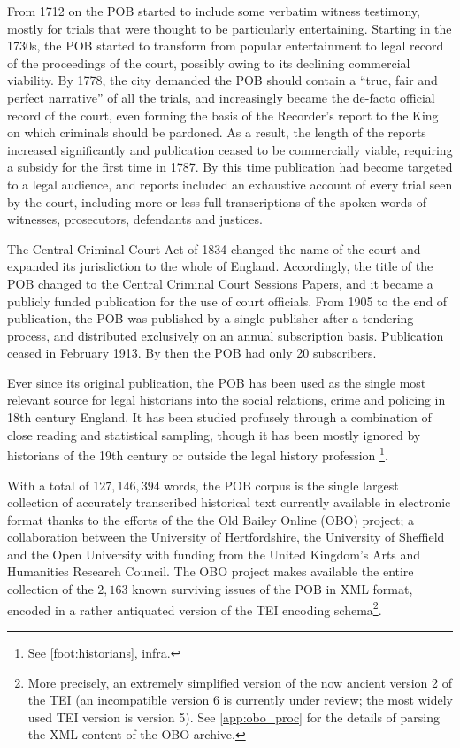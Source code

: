 From 1712 on the POB started to include some verbatim witness testimony, mostly for trials that were thought to be particularly entertaining.
Starting in the 1730s, the POB started to transform from popular entertainment to legal record of the proceedings of the court, possibly owing to its declining commercial viability.
By 1778, the city demanded the POB should contain a \enquote{true, fair and perfect narrative} of all the trials, and increasingly became the de-facto official record of the court, even forming the basis of the Recorder's report to the King on which criminals should be pardoned.
As a result, the length of the reports increased significantly and publication ceased to be commercially viable, requiring a subsidy for the first time in 1787.
By this time publication had become targeted to a legal audience, and reports included an exhaustive account of every trial seen by the court, including more or less full transcriptions of the spoken words of witnesses, prosecutors, defendants and justices.

The Central Criminal Court Act of 1834 changed the name of the court and expanded its jurisdiction to the whole of England.
Accordingly, the title of the POB changed to the Central Criminal Court Sessions Papers, and it became a publicly funded publication for the use of court officials.
From 1905 to the end of publication, the POB was published by a single publisher after a tendering process, and distributed exclusively on an annual subscription basis.
Publication ceased in February 1913.
By then the POB had only 20 subscribers.

Ever since its original publication, the POB has been used as the single most relevant source for legal historians into the social relations, crime and policing in 18th century England. It has been studied profusely through a combination of close reading and statistical sampling, though it has been mostly ignored by historians of the 19th century or outside the legal history profession \citep{hitchcock2016}\footnote{
    See \autoref{foot:historians}, infra.
}.

With a total of $127,146,394$ words, the POB corpus is the single largest collection of accurately transcribed historical text currently available in electronic format thanks to the efforts of the the Old Bailey Online (OBO) project; a collaboration between the University of Hertfordshire, the University of Sheffield and the Open University with funding from the United Kingdom's Arts and Humanities Research Council.
The OBO project makes available the entire collection of the $2,163$ known surviving issues of the POB in XML format, encoded in a rather antiquated version of the TEI encoding schema\footnote{
    \label{foot:oldtei}
    More precisely, an extremely simplified version of the now ancient version 2 of the TEI (an incompatible version 6 is currently under review; the most widely used TEI version is version 5). %
    See \autoref{app:obo_proc} for the details of parsing the XML content of the OBO archive.
}.

